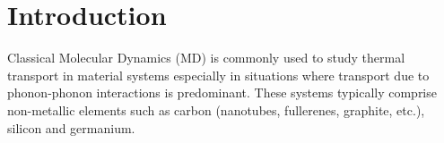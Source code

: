 \section{Introduction}
\label{sec:intro}

\begin{comment}
1. Background on use of MD simulations for thermal transport, preferred for studying
thermal transport by phononic interactions (refer notes from book suggested by Amuthan)


2. One approach to NEMD is the Direct Method, commonly used for estimating the bulk
thermal conductivity. A brief discussion on the direct method and associated pros and cons
(notes from Dellan's paper and book suggested by Amuthan) 
Predictions impacted by the choice of potential, values of
individual parameters, size, and potentially due to duration and applied thermal gradients
(cite Amuthan book, Francesco's paper, McGaughey's paper). 
Errors are introduced by thermostatting (Amuthan book). Nominal value of SW potential parameters based on fitting against experiments and to ensure structural stability etc. (SW paper)

3. Motivate uncertainty analysis and briefly discuss and cite recent efforts (Francesco, Kirby,
Murthy). Highlight focus and key contributions of the present work and how it differs from
those efforts. 

4. Section-wise overview of the paper.  
\end{comment}

Classical Molecular Dynamics (MD) is commonly used to study thermal transport in material systems 
especially in situations where transport due to phonon-phonon interactions is predominant. These 
systems typically comprise non-metallic elements such as carbon (nanotubes, fullerenes, graphite, etc.),
silicon and germanium. 
